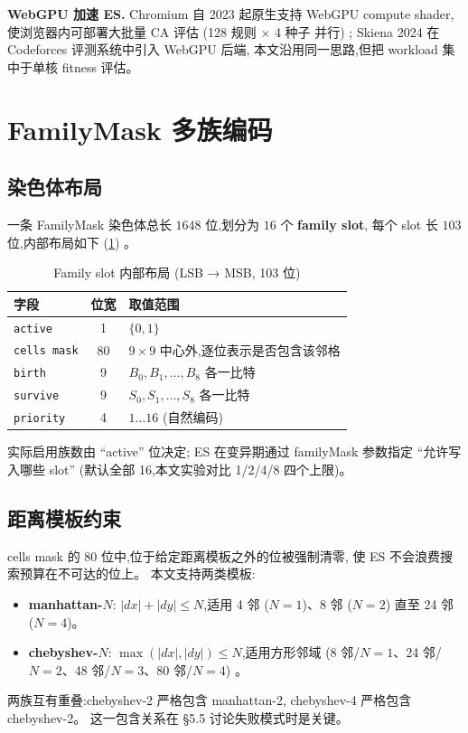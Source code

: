 \documentclass[11pt,a4paper]{article}
\begin{document}
\textbf{WebGPU 加速 ES.}
Chromium 自 2023 起原生支持 WebGPU compute shader,
使浏览器内可部署大批量 CA 评估 (128 规则 $\times$ 4 种子 并行) ;
Skiena 2024 在 Codeforces 评测系统中引入 WebGPU 后端,
本文沿用同一思路,但把 workload 集中于单核 fitness 评估。

\section{FamilyMask 多族编码}
\subsection{染色体布局}
一条 FamilyMask 染色体总长 $1648$ 位,划分为 $16$ 个 \textbf{family slot},
每个 slot 长 $103$ 位,内部布局如下 (\ref{tab:slot}) 。

\begin{table}[H]
\centering\small
\caption{Family slot 内部布局 (LSB → MSB, 103 位)}
\label{tab:slot}
\begin{tabular}{lcl}
\toprule
\textbf{字段} & \textbf{位宽} & \textbf{取值范围}\\
\midrule
\texttt{active}      & 1  & $\{0, 1\}$ \\
\texttt{cells mask}  & 80 & $9\times 9$ 中心外,逐位表示是否包含该邻格 \\
\texttt{birth}       & 9  & $B_0, B_1, \ldots, B_8$ 各一比特 \\
\texttt{survive}     & 9  & $S_0, S_1, \ldots, S_8$ 各一比特 \\
\texttt{priority}    & 4  & $1 \ldots 16$ (自然编码) \\
\bottomrule
\end{tabular}
\end{table}

实际启用族数由 ``active'' 位决定;
ES 在变异期通过 familyMask 参数指定 ``允许写入哪些 slot''
(默认全部 16,本文实验对比 1/2/4/8 四个上限)。

\subsection{距离模板约束}
cells mask 的 80 位中,位于给定距离模板之外的位被强制清零,
使 ES 不会浪费搜索预算在不可达的位上。
本文支持两类模板:
\begin{itemize}[leftmargin=*,itemsep=0pt,topsep=0pt]
\item \textbf{manhattan-$N$}: $|dx|+|dy| \le N$,适用 4 邻 ($N=1$)、8 邻 ($N=2$) 直至 24 邻 ($N=4$)。
\item \textbf{chebyshev-$N$}: $\max(|dx|,|dy|) \le N$,适用方形邻域 (8 邻/$N=1$、24 邻/$N=2$、48 邻/$N=3$、80 邻/$N=4$) 。
\end{itemize}
两族互有重叠:chebyshev-2 严格包含 manhattan-2,
chebyshev-4 严格包含 chebyshev-2。
这一包含关系在 §5.5 讨论失败模式时是关键。
\end{document}
